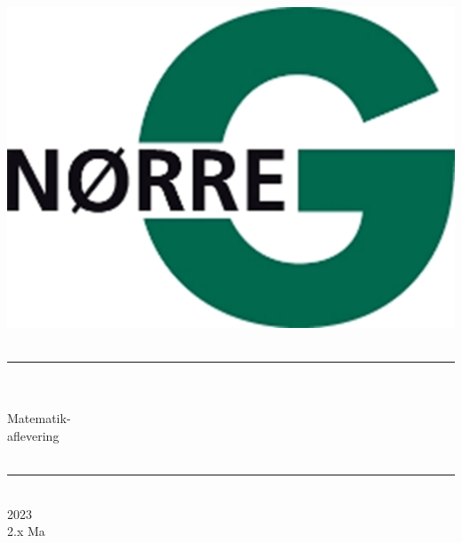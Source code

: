 \documentclass[12pt,x11names,a4paper]{article}
\begin{document}
%

\begin{titlepage}

\begin{minipage}{0.27\textwidth}

\end{minipage}
\begin{minipage}{0.73\textwidth}
\begin{center}
\phantom{h} \vspace{1cm}\\
\hspace{4cm}
\includegraphics[scale = 1]{Billeder/Norreg.png} \\
\phantom{h} \vspace{5cm}\\
\rule{0.7\textwidth}{0.3mm}\\
\phantom{h}\\
{\fontsize{50}{60}\selectfont Matematik-\\aflevering}\\
\phantom{h}\\
\rule{0.7\textwidth}{0.3mm}\\
\Large 2023\\
\Large 2.x Ma

\end{center}
\end{minipage}
\end{titlepage}
\end{document}
